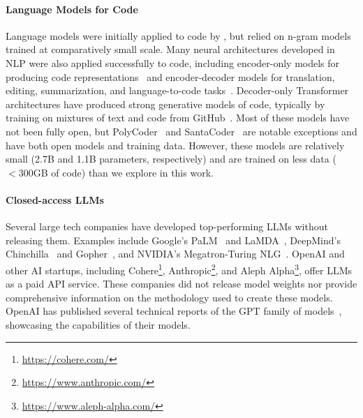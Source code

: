 \documentclass[10pt]{article} %
\begin{document}
\paragraph{Language Models for Code}
Language models were initially applied to code by \citet{hindle2012naturalness}, but relied on n-gram models trained at comparatively small scale. 
Many neural architectures developed in NLP were also applied successfully to code, including encoder-only models for producing code representations~\citep{feng2020codebert,kanade2020embeddings} and encoder-decoder models for translation, editing, summarization, and language-to-code tasks~\citep{wang-etal-2021-codet5,ahmad2021plbart,li2022competition}.
Decoder-only Transformer architectures have produced strong generative models of code, typically by training on mixtures of text and code from GitHub~\citep{chen2021codex,austin2021program,fried2022incoder,qinkai:codegeex,nijkamp:codegen}.
Most of these models have not been fully open, but
PolyCoder~\citep{xu2022systematicevaluation} and SantaCoder~\citep{allal2023santacoder} are notable exceptions and have both open models and training data.  However, these models are relatively small (2.7B and 1.1B parameters, respectively) and are trained on less data ($<300$GB of code) than we explore in this work.

\paragraph{Closed-access LLMs}
Several large tech companies have developed top-performing LLMs without releasing them. Examples include Google's PaLM~\citep{chowdhery2022palm} and LaMDA~\citep{thoppilan2022lamda}, DeepMind's Chinchilla~\citep{hoffmann2022training} and Gopher~\citep{rae2021scaling}, and NVIDIA's Megatron-Turing NLG~\citep{smith2022using}. OpenAI and other AI startups, including Cohere\footnote{\url{https://cohere.com/}}, Anthropic\footnote{\url{https://www.anthropic.com/}}, and Aleph Alpha\footnote{\url{https://www.aleph-alpha.com/}}, offer LLMs as a paid API service. These companies did not release model weights nor provide comprehensive information on the methodology used to create these models. OpenAI has published several technical reports of the GPT family of models~\citep{brown2020language,chen2021codex,openai2023gpt4}, showcasing the capabilities of their models. 
\end{document}
